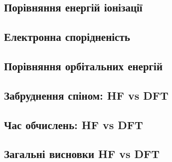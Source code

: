 

\subsection{Порівняння енергій іонізації}


\subsection{Електронна спорідненість}



\subsection{Порівняння орбітальних енергій}


\subsection{Забруднення спіном: HF vs DFT}


\subsection{Час обчислень: HF vs DFT}


\subsection{Загальні висновки HF vs DFT}

